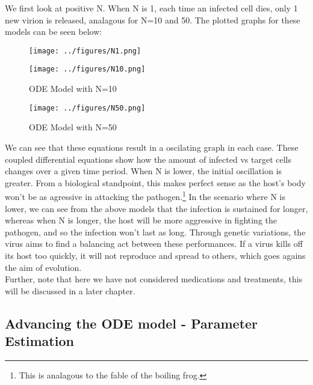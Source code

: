 We first look at positive N. When N is 1, each time an infected cell dies, only 1 new virion is released, analagous for N=10 and 50. The plotted graphs for these models can be seen below:

\begin{figure}[h]
    \centering
    \begin{minipage}[b]{0.4\textwidth}
        \texttt{[image: ../figures/N1.png]}
        \caption{ODE Model with N=1}%
    \end{minipage}
    \hfill
    \centering
    \begin{minipage}[b] {0.4\textwidth}   
        \texttt{[image: ../figures/N10.png]}
        \caption{ODE Model with N=10}%
    \end{minipage}
\end{figure}

\begin{figure}[h]
    \centering
    \texttt{[image: ../figures/N50.png]}
    \caption{ODE Model with N=50}%
\end{figure}

We can see that these equations result in a oscilating graph in each case. These coupled differential equations show how the amount of infected vs target cells changes over a given time period. When N is lower, the initial oscillation is greater. From a biological standpoint, this makes perfect sense as the host's body won't be as agressive in attacking the pathogen.\footnote{This is analagous to the fable of the boiling frog.} In the scenario where N is lower, we can see from the above models that the infection is sustained for longer, whereas when N is longer, the host will be more aggressive in fighting the pathogen, and so the infection won't last as long. Through genetic variations, the virus aims to find a balancing act between these performances. If a virus kills off its host too quickly, it will not reproduce and spread to others, which goes agains the aim of evolution. \\

Further, note that here we have not considered medications and treatments, this will be discussed in a later chapter.

\subsection{Advancing the ODE model - Parameter Estimation}

